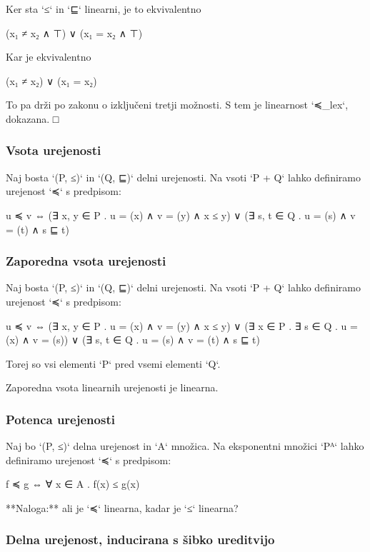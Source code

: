 Ker sta `≤` in `⊑` linearni, je to ekvivalentno

    (x₁ ≠ x₂ ∧ ⊤) ∨ (x₁ = x₂ ∧ ⊤)

Kar je ekvivalentno

    (x₁ ≠ x₂) ∨ (x₁ = x₂)

To pa drži po zakonu o izključeni tretji možnosti. S tem je linearnost `≼_lex`, dokazana. □


\subsubsection{Vsota urejenosti}

Naj bosta `(P, ≤)` in `(Q, ⊑)` delni urejenosti. Na vsoti `P + Q` lahko
definiramo urejenost `≼` s predpisom:

    u ≼ v ⇔ (∃ x, y ∈ P . u = \inl(x) ∧ v = \inl(y) ∧ x ≤ y) ∨
            (∃ s, t ∈ Q . u = \inr(s) ∧ v = \inr(t) ∧ s ⊑ t)

\subsubsection{Zaporedna vsota urejenosti}

Naj bosta `(P, ≤)` in `(Q, ⊑)` delni urejenosti. Na vsoti `P + Q` lahko definiramo urejenost `≼` s predpisom:

    u ≼ v ⇔ (∃ x, y ∈ P . u = \inl(x) ∧ v = \inl(y) ∧ x ≤ y) ∨
            (∃ x ∈ P . ∃ s ∈ Q . u = \inl(x) ∧ v = \inr(s)) ∨
            (∃ s, t ∈ Q . u = \inr(s) ∧ v = \inr(t) ∧ s ⊑ t)

Torej so vsi elementi `P` pred vsemi elementi `Q`.

Zaporedna vsota linearnih urejenosti je linearna.


\subsubsection{Potenca urejenosti}

Naj bo `(P, ≤)` delna urejenost in `A` množica. Na eksponentni množici `Pᴬ` lahko definiramo urejenost `≼` s predpisom:

    f ≼ g ⇔ ∀ x ∈ A . f(x) ≤ g(x)

**Naloga:** ali je `≼` linearna, kadar je `≤` linearna?


\subsubsection{Delna urejenost, inducirana s šibko ureditvijo}

